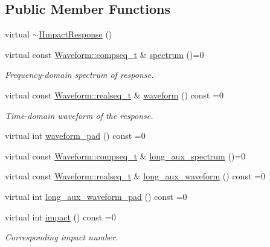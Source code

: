 \subsection*{Public Member Functions}
\begin{DoxyCompactItemize}
\item 
virtual \hyperlink{class_wire_cell_1_1_i_impact_response_a1e058d161735e892d8fd53f8d5a5765c}{$\sim$\+I\+Impact\+Response} ()
\item 
virtual const \hyperlink{namespace_wire_cell_1_1_waveform_a7e4a8d371f774438bb360e7d1dcb583a}{Waveform\+::compseq\+\_\+t} \& \hyperlink{class_wire_cell_1_1_i_impact_response_ade63911c39df242ecc8b6858916b0fc8}{spectrum} ()=0
\begin{DoxyCompactList}\small\item\em Frequency-\/domain spectrum of response. \end{DoxyCompactList}\item 
virtual const \hyperlink{namespace_wire_cell_1_1_waveform_a479175e541c8545e87cd8063b74b6956}{Waveform\+::realseq\+\_\+t} \& \hyperlink{class_wire_cell_1_1_i_impact_response_a3f4821a846e98daf92768e33e795df8d}{waveform} () const =0
\begin{DoxyCompactList}\small\item\em Time-\/domain waveform of the response. \end{DoxyCompactList}\item 
virtual int \hyperlink{class_wire_cell_1_1_i_impact_response_ae706c2b62577ed856bfdb6d9453b9d98}{waveform\+\_\+pad} () const =0
\item 
virtual const \hyperlink{namespace_wire_cell_1_1_waveform_a7e4a8d371f774438bb360e7d1dcb583a}{Waveform\+::compseq\+\_\+t} \& \hyperlink{class_wire_cell_1_1_i_impact_response_a9f7ad74ee3cbc5b5cb5138d4bfaf29b5}{long\+\_\+aux\+\_\+spectrum} ()=0
\item 
virtual const \hyperlink{namespace_wire_cell_1_1_waveform_a479175e541c8545e87cd8063b74b6956}{Waveform\+::realseq\+\_\+t} \& \hyperlink{class_wire_cell_1_1_i_impact_response_ac4f1779e2e202ddb853ec1df8fd38d6d}{long\+\_\+aux\+\_\+waveform} () const =0
\item 
virtual int \hyperlink{class_wire_cell_1_1_i_impact_response_a2f9b7f14cf42e37639c193238f357c43}{long\+\_\+aux\+\_\+waveform\+\_\+pad} () const =0
\item 
virtual int \hyperlink{class_wire_cell_1_1_i_impact_response_a13026bcae5d6d06701752f96a9544c5d}{impact} () const =0
\begin{DoxyCompactList}\small\item\em Corresponding impact number. \end{DoxyCompactList}\end{DoxyCompactItemize}
